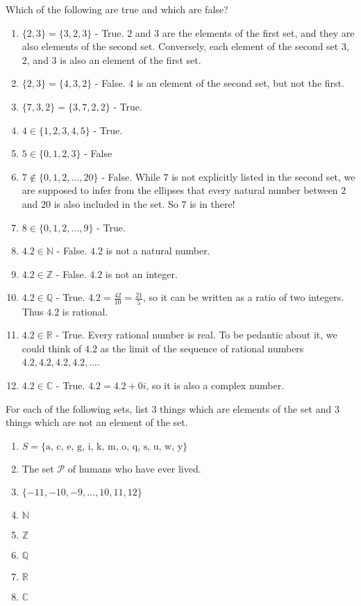 \begin{solutions}
	Which of the following are true and which are false?
	
	\begin{enumerate}
		\item $\{2,3\} = \{3, 2,3\}$ - True.  $2$ and $3$ are the elements of the first set, and they are also elements of the second set.  Conversely, each element of the second set $3$,  $2$, and $3$ is also an element of the first set. 
		\item $\{2,3\} = \{4,3,2\}$  - False.  $4$ is an element of the second set, but not the first.
		\item $\{7,3,2\} = \{3,7,2,2\}$ - True.
		\item $4 \in \{1,2,3,4,5\}$ - True.
		\item $5 \in \{0,1,2,3\}$ - False
		\item $7 \notin \{0,1,2, \dots, 20\}$ - False.  While $7$ is not explicitly listed in the second set, we are supposed to infer from the ellipses that every natural number between $2$ and $20$ is also included in the set.  So $7$ is in there!
		\item $8 \in \{0,1,2, \dots,  9\}$ - True.
		\item $4.2 \in \mathbb{N}$ - False.  $4.2$ is not a natural number.
		\item $4.2 \in \mathbb{Z}$ - False.  $4.2$ is not an integer.
		\item $4.2 \in \mathbb{Q}$ - True.  $4.2 = \frac{42}{10} = \frac{21}{5}$, so it can be written as a ratio of two integers.  Thus $4.2$ is rational.
		\item $4.2 \in \mathbb{R}$ - True.  Every rational number is real.  To be pedantic about it, we could think of $4.2$ as the limit of the sequence of rational numbers $4.2, 4.2, 4.2, 4.2, \dots$.
		\item $4.2 \in \mathbb{C}$ - True.  $4.2 = 4.2+0i$, so it is also a complex number.
	\end{enumerate}
\end{solutions}

\begin{xca}
		For each of the following sets, list $3$ things which are elements of the set and $3$ things which are not an element of the set.
		
		\begin{enumerate}
				\item $S = \{\textrm{a, c, e, g, i, k, m, o, q, s, u, w, y}\}$
				\item The set $\mathcal{P}$ of humans who have ever lived.
				\item  $\{-11,-10, -9,  \dots, 10, 11, 12\}$
				\item $\mathbb{N}$
				\item $\mathbb{Z}$
				\item $\mathbb{Q}$
				\item $\mathbb{R}$
				\item $\mathbb{C}$
			\end{enumerate}
	\end{xca}

